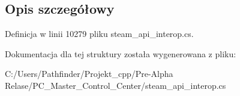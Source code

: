 \subsection{Opis szczegółowy}


Definicja w linii 10279 pliku steam\+\_\+api\+\_\+interop.\+cs.



Dokumentacja dla tej struktury została wygenerowana z pliku\+:\begin{DoxyCompactItemize}
\item 
C\+:/\+Users/\+Pathfinder/\+Projekt\+\_\+cpp/\+Pre-\/\+Alpha Relase/\+P\+C\+\_\+\+Master\+\_\+\+Control\+\_\+\+Center/steam\+\_\+api\+\_\+interop.\+cs\end{DoxyCompactItemize}
